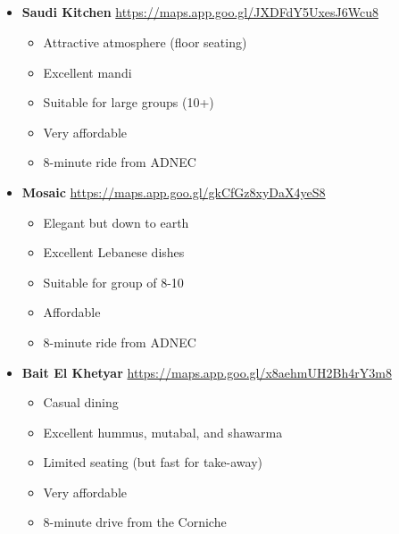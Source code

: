 \\
\\ 

\\
\\
\begin{itemize}[noitemsep]
    \item \textbf{Saudi Kitchen} \url{https://maps.app.goo.gl/JXDFdY5UxesJ6Wcu8}
    \begin{itemize}[noitemsep]
        \item Attractive atmosphere (floor seating)
        \item Excellent mandi
        \item Suitable for large groups (10+)
        \item Very affordable
        \item 8-minute ride from ADNEC
    \end{itemize}
    
    \item \textbf{Mosaic} \url{https://maps.app.goo.gl/gkCfGz8xyDaX4yeS8}
    \begin{itemize}[noitemsep]
        \item Elegant but down to earth
        \item Excellent Lebanese dishes
        \item Suitable for group of 8-10
        \item Affordable
        \item 8-minute ride from ADNEC
    \end{itemize}
    
    \item \textbf{Bait El Khetyar} \url{https://maps.app.goo.gl/x8aehmUH2Bh4rY3m8}
    \begin{itemize}[noitemsep]
        \item Casual dining
        \item Excellent hummus, mutabal, and shawarma
        \item Limited seating (but fast for take-away)
        \item Very affordable
        \item 8-minute drive from the Corniche
    \end{itemize}
    

\end{itemize}
